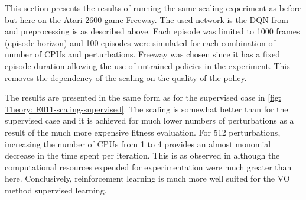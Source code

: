 This section presents the results of running the same scaling experiment as before but here on the Atari-2600 game Freeway. The used network is the DQN from \cite{Mnih2015} and preprocessing is as described above. Each episode was limited to 1000 frames (episode horizon) and 100 episodes were simulated for each combination of number of \glspl{CPU} and perturbations. Freeway was chosen since it has a fixed episode duration allowing the use of untrained policies in the experiment. This removes the dependency of the scaling on the quality of the policy.

The results are presented in the same form as for the supervised case in \autoref{fig: Theory: E011-scaling-supervised}. The scaling is somewhat better than for the supervised case and it is achieved for much lower numbers of perturbations as a result of the much more expensive fitness evaluation. For 512 perturbations, increasing the number of \glspl{CPU} from 1 to 4 provides an almost monomial decrease in the time spent per iteration. This is as observed in \cite{Salimans2017} although the computational resources expended for experimentation were much greater than here. Conclusively, reinforcement learning is much more well suited for the \gls{VO} method supervised learning.

